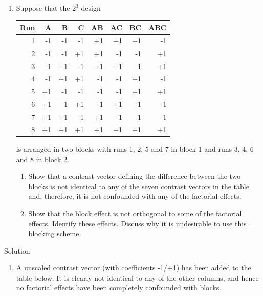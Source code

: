 \documentclass[
]{book}
\providecommand{\tightlist}{%
  \setlength{\itemsep}{0pt}\setlength{\parskip}{0pt}}
\theoremstyle{definition}
\theoremstyle{definition}
\theoremstyle{definition}
\theoremstyle{definition}
\theoremstyle{remark}
\begin{document}
\begin{enumerate}
\def\labelenumi{\arabic{enumi}.}
\setcounter{enumi}{2}
\item
  Suppose that the \(2^3\) design

  \begin{longtable}[]{@{}rrrrrrrr@{}}
  \toprule()
  Run & A & B & C & AB & AC & BC & ABC \\
  \midrule()
  \endhead
  1 & -1 & -1 & -1 & +1 & +1 & +1 & -1 \\
  2 & -1 & -1 & +1 & +1 & -1 & -1 & +1 \\
  3 & -1 & +1 & -1 & -1 & +1 & -1 & +1 \\
  4 & -1 & +1 & +1 & -1 & -1 & +1 & -1 \\
  5 & +1 & -1 & -1 & -1 & -1 & +1 & +1 \\
  6 & +1 & -1 & +1 & -1 & +1 & -1 & -1 \\
  7 & +1 & +1 & -1 & +1 & -1 & -1 & -1 \\
  8 & +1 & +1 & +1 & +1 & +1 & +1 & +1 \\
  \bottomrule()
  \end{longtable}

  is arranged in two blocks with runs 1, 2, 5 and 7 in block 1 and runs 3, 4, 6 and 8 in block 2.

  \begin{enumerate}
  \def\labelenumii{\alph{enumii}.}
  \item
    Show that a contrast vector defining the difference between the two blocks is not identical to any of the seven contrast vectors in the table and, therefore, it is not confounded with any of the factorial effects.
  \item
    Show that the block effect is not orthogonal to some of the factorial effects. Identify these effects. Discuss why it is undesirable to use this blocking scheme.
  \end{enumerate}
\end{enumerate}

Solution

\begin{enumerate}
\def\labelenumi{\alph{enumi}.}
\tightlist
\item
  A unscaled contrast vector (with coefficients -1/+1) has been added to the table below. It is clearly not identical to any of the other columns, and hence no factorial effects have been completely confounded with blocks.
\end{enumerate}
\end{document}
